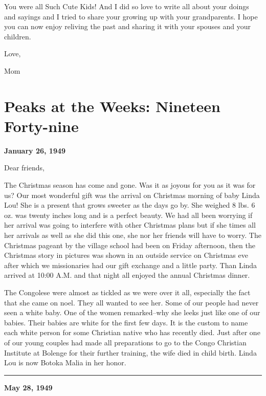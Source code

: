 \documentclass[]{book}
\begin{document}
You were all Such Cute Kids! And I did so love to write all about your doings and sayings and I tried to share your growing up with your grandparents. I hope you can now enjoy reliving the past and sharing it with your spouses and your children.

Love,

Mom

\hypertarget{peaks-at-the-weeks-nineteen-forty-nine}{%
\chapter{Peaks at the Weeks: Nineteen Forty-nine}\label{peaks-at-the-weeks-nineteen-forty-nine}}

\textbf{January 26, 1949}

Dear friends,

The Christmas season has come and gone. Was it as joyous for you as it was for us? Our most wonderful gift was the arrival on Christmas morning of baby Linda Lou! She is a present that grows sweeter as the days go by. She weighed 8 lbs. 6 oz. was twenty inches long and is a perfect beauty. We had all been worrying if her arrival was going to interfere with other Christmas plans but if she times all her arrivals as well as she did this one, she nor her friends will have to worry. The Christmas pageant by the village school had been on Friday afternoon, then the Christmas story in pictures was shown in an outside service on Christmas eve after which we missionaries had our gift exchange and a little party. Than Linda arrived at 10:00 A.M. and that night all enjoyed the annual Christmas dinner.

The Congolese were almost as tickled as we were over it all, especially the fact that she came on noel. They all wanted to see her. Some of our people had never seen a white baby. One of the women remarked--why she leeks just like one of our babies. Their babies are white for the first few days. It is the custom to name each white person for some Christian native who has recently died. Just after one of our young couples had made all preparations to go to the Congo Christian Institute at Bolenge for their further training, the wife died in child birth. Linda Lou is now Botoka Malia in her honor.

\begin{center}\rule{0.5\linewidth}{\linethickness}\end{center}

\textbf{May 28, 1949}
\end{document}
